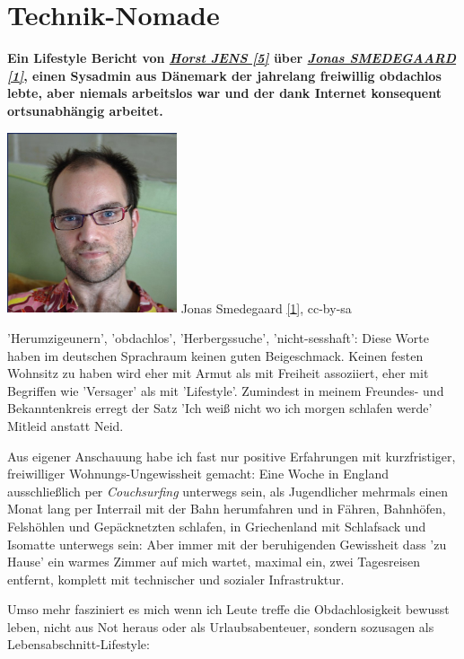 \section*{Technik-Nomade}
\hypertarget{nomad}{}
\label{nomad}

\textbf{Ein Lifestyle Bericht von \href{http://spielend-programmieren.at}{\textit{Horst JENS [5]}} \"uber \href{http://dr.jones.dk}{\textit{Jonas SMEDEGAARD [1]}}, einen Sysadmin aus D\"anemark der jahrelang freiwillig obdachlos lebte, aber niemals arbeitslos war und der dank Internet konsequent ortsunabh\"angig arbeitet.}
\begin{center}
\includegraphics[width=5cm]{nomad/nomad-jonas.jpg}
\footnotesize{Jonas Smedegaard \href{http://dr.jones.dk}{{[}1{]}}, cc-by-sa}
\end{center}

'Herumzigeunern', 'obdachlos', 'Herbergssuche', 'nicht-sesshaft': Diese Worte haben im deutschen Sprachraum keinen guten Beigeschmack. Keinen festen Wohnsitz zu haben wird eher mit Armut als mit Freiheit assoziiert, eher mit Begriffen wie 'Versager' als mit 'Lifestyle'. Zumindest in meinem Freundes- und Bekanntenkreis erregt der Satz 'Ich weiß nicht wo ich morgen schlafen werde' Mitleid anstatt Neid.

Aus eigener Anschauung habe ich fast nur positive Erfahrungen mit kurzfristiger, freiwilliger Wohnungs-Ungewissheit gemacht: Eine Woche in England ausschließlich per \textit{Couchsurfing} unterwegs sein, als Jugendlicher mehrmals einen Monat lang per Interrail mit der Bahn herumfahren und in Fähren, Bahnhöfen, Felshöhlen und Gepäcknetzten schlafen, in Griechenland mit Schlafsack und Isomatte unterwegs sein: Aber immer mit der beruhigenden Gewissheit dass 'zu Hause' ein warmes Zimmer auf mich wartet, maximal ein, zwei Tagesreisen entfernt, komplett mit technischer und sozialer Infrastruktur. 

Umso mehr fasziniert es mich wenn ich Leute treffe die Obdachlosigkeit bewusst leben, nicht aus Not heraus oder als Urlaubsabenteuer, sondern sozusagen als Lebensabschnitt-Lifestyle: 

